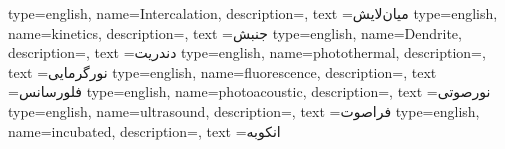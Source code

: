 {
    type=english,
    name={Intercalation},
    description={},
    text ={میان‌لایش}
}
{
    type=english,
    name={kinetics},
    description={},
    text ={جنبش}
}
{
    type=english,
    name={Dendrite},
    description={},
    text ={دندریت}
}
{
    type=english,
    name={photothermal},
    description={},
    text ={نورگرمایی}
}
{
    type=english,
    name={fluorescence},
    description={},
    text ={فلورسانس}
}
{
    type=english,
    name={photoacoustic},
    description={},
    text ={نورصوتی}
}
{
    type=english,
    name={ultrasound},
    description={},
    text ={فراصوت}
}
{
    type=english,
    name={incubated},
    description={},
    text ={انکوبه}
}